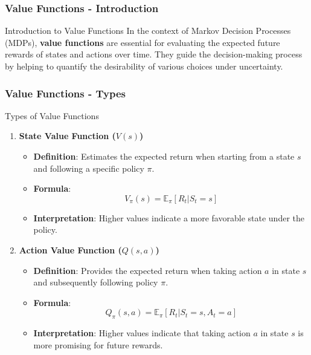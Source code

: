 \documentclass[aspectratio=169]{beamer}
\begin{document}
\begin{frame}[fragile]
    \frametitle{Value Functions - Introduction}
    \begin{block}{Introduction to Value Functions}
        In the context of Markov Decision Processes (MDPs), \textbf{value functions} are essential for evaluating the expected future rewards of states and actions over time. 
        They guide the decision-making process by helping to quantify the desirability of various choices under uncertainty.
    \end{block}
\end{frame}

\begin{frame}[fragile]
    \frametitle{Value Functions - Types}
    \begin{block}{Types of Value Functions}
        \begin{enumerate}
            \item \textbf{State Value Function (\(V(s)\))}
            \begin{itemize}
                \item \textbf{Definition}: Estimates the expected return when starting from a state \(s\) and following a specific policy \(\pi\).
                \item \textbf{Formula}:
                \begin{equation}
                V_\pi(s) = \mathbb{E}_\pi [R_t | S_t = s]
                \end{equation}
                \item \textbf{Interpretation}: Higher values indicate a more favorable state under the policy.
            \end{itemize}
            
            \item \textbf{Action Value Function (\(Q(s, a)\))}
            \begin{itemize}
                \item \textbf{Definition}: Provides the expected return when taking action \(a\) in state \(s\) and subsequently following policy \(\pi\).
                \item \textbf{Formula}:
                \begin{equation}
                Q_\pi(s, a) = \mathbb{E}_\pi [R_t | S_t = s, A_t = a]
                \end{equation}
                \item \textbf{Interpretation}: Higher values indicate that taking action \(a\) in state \(s\) is more promising for future rewards.
            \end{itemize}
        \end{enumerate}
    \end{block}
\end{frame}
\end{document}
